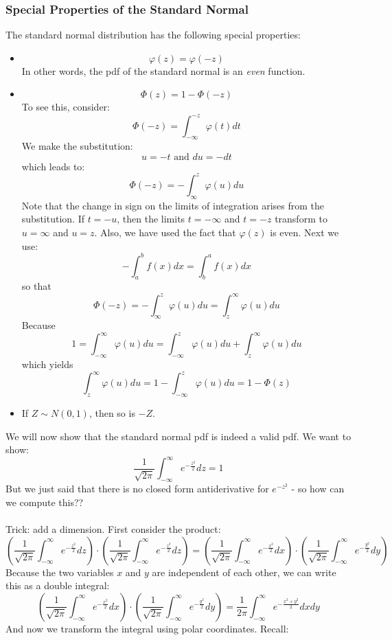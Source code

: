 \documentclass[12pt]{article} %
\begin{document}
\subsubsection{Special Properties of the Standard Normal}
The standard normal distribution has the following special properties:
\begin{itemize}
\item $$\varphi(z) = \varphi(-z)$$
In other words, the pdf of the standard normal is an \emph{even} function.
\item $$\Phi(z) = 1- \Phi(-z)$$
To see this, consider:
$$\Phi(-z) = \int_{-\infty}^{-z} \varphi(t) dt$$
We make the substitution:
$$u = -t \textrm{ and } du = -dt$$
which leads to:
$$\Phi(-z) = -\int_{\infty}^{z} \varphi(u) du$$
Note that the change in sign on the limits of integration arises from the substitution. If $t=-u$, then the limits $t=-\infty$ and $t=-z$ transform to $u=\infty$ and $u=z$. Also, we have used the fact that $\varphi(z)$ is even. Next we use:
$$-\int_a^b f(x) dx = \int_b^a f(x) dx$$
so that 
 $$\Phi(-z) = -\int_{\infty}^{z} \varphi(u) du = \int_{z}^{\infty} \varphi(u) du$$
Because
$$1 = \int_{-\infty}^\infty \varphi(u) du = \int_{-\infty}^z \varphi(u) du + \int_{z}^\infty \varphi(u) du $$
which yields
$$\int_{z}^\infty \varphi(u) du = 1 - \int_{-\infty}^z \varphi(u) du = 1-\Phi(z)$$
\item If $Z\sim N(0,1)$, then so is $-Z$.
\end{itemize}
We will now show that the standard normal pdf is indeed a valid pdf. We want to show:
$$\frac1{\sqrt{2\pi}} \int_{-\infty}^{\infty} e^{-\frac{z^2}2} dz = 1$$
But we just said that there is no closed form antiderivative for $e^{-z^2}$ - so how can we compute this??\\\\
Trick: add a dimension. First consider the product:
$$\left(\frac1{\sqrt{2\pi}} \int_{-\infty}^{\infty} e^{-\frac{z^2}2} dz\right)\cdot \left(\frac1{\sqrt{2\pi}} \int_{-\infty}^{\infty} e^{-\frac{z^2}2} dz\right) = \left(\frac1{\sqrt{2\pi}} \int_{-\infty}^{\infty} e^{-\frac{x^2}2} dx\right)\cdot \left(\frac1{\sqrt{2\pi}} \int_{-\infty}^{\infty} e^{-\frac{y^2}2} dy\right)$$
Because the two variables $x$ and $y$ are independent of each other, we can write this as a double integral:
$$\left(\frac1{\sqrt{2\pi}} \int_{-\infty}^{\infty} e^{-\frac{x^2}2} dx\right)\cdot \left(\frac1{\sqrt{2\pi}} \int_{-\infty}^{\infty} e^{-\frac{y^2}2} dy\right) = \frac1{{2\pi}} \int_{-\infty}^{\infty} e^{-\frac{x^2+y^2}2} dx dy$$
And now we transform the integral using polar coordinates. Recall:
\end{document}
